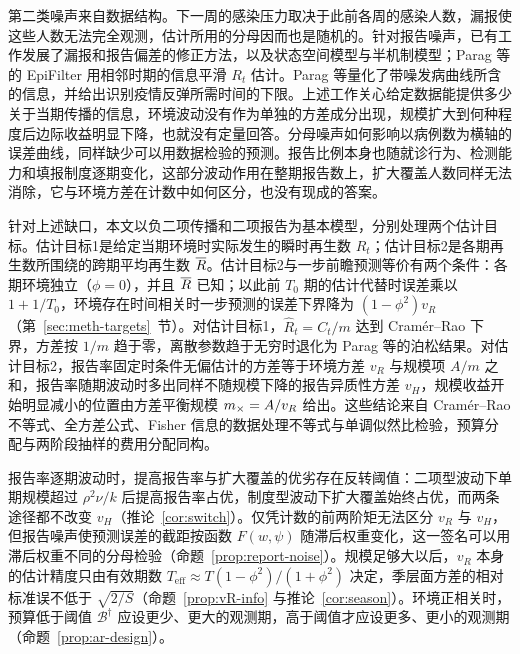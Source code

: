 第二类噪声来自数据结构。下一周的感染压力取决于此前各周的感染人数，漏报使这些人数无法完全观测，估计所用的分母因而也是随机的。针对报告噪声，已有工作发展了漏报和报告偏差的修正方法\citep{azmon2014estimating, stoner2019hierarchical, bracher2021marginal}，以及状态空间模型与半机制模型\citep{breto2009time, bhatt2023semi, flaxman2020estimating}；Parag 等\citep{parag2021improved}的 EpiFilter 用相邻时期的信息平滑 $R_t$ 估计。Parag 等\citep{parag2022quantifying, parag2022fundamental, parag2025asymmetric}量化了带噪发病曲线所含的信息，并给出识别疫情反弹所需时间的下限。上述工作关心给定数据能提供多少关于当期传播的信息，环境波动没有作为单独的方差成分出现，规模扩大到何种程度后边际收益明显下降，也就没有定量回答。分母噪声如何影响以病例数为横轴的误差曲线，同样缺少可以用数据检验的预测。报告比例本身也随就诊行为、检测能力和填报制度逐期变化，这部分波动作用在整期报告数上，扩大覆盖人数同样无法消除，它与环境方差在计数中如何区分，也没有现成的答案。

针对上述缺口，本文以负二项传播和二项报告为基本模型，分别处理两个估计目标。估计目标1是给定当期环境时实际发生的瞬时再生数 $R_t$；估计目标2是各期再生数所围绕的跨期平均再生数 $\overline{R}$。估计目标2与一步前瞻预测等价有两个条件：各期环境独立（$\phi=0$），并且 $\overline{R}$ 已知；以此前 $T_0$ 期的估计代替时误差乘以 $1+1/T_0$，环境存在时间相关时一步预测的误差下界降为 $(1-\phi^2)v_R$（第~\ref{sec:meth-targets}~节）。对估计目标1，$\widehat R_t=C_t/m$ 达到 Cramér--Rao 下界，方差按 $1/m$ 趋于零，离散参数趋于无穷时退化为 Parag 等的泊松结果。对估计目标2，报告率固定时条件无偏估计的方差等于环境方差 $v_R$ 与规模项 $A/m$ 之和，报告率随期波动时多出同样不随规模下降的报告异质性方差 $v_H$，规模收益开始明显减小的位置由方差平衡规模 $m_{\times}=A/v_R$ 给出。这些结论来自 Cramér--Rao 不等式、全方差公式、Fisher 信息的数据处理不等式与单调似然比检验\citep{casella2002statistical, lehmann2005testing, zamir1998proof}，预算分配与两阶段抽样的费用分配同构\citep{cochran1977sampling}。

报告率逐期波动时，提高报告率与扩大覆盖的优劣存在反转阈值：二项型波动下单期规模超过 $\rho^2\nu/k$ 后提高报告率占优，制度型波动下扩大覆盖始终占优，而两条途径都不改变 $v_H$（推论~\ref{cor:switch}）。仅凭计数的前两阶矩无法区分 $v_R$ 与 $v_H$，但报告噪声使预测误差的截距按函数 $F(w,\psi)$ 随滞后权重变化，这一签名可以用滞后权重不同的分母检验（命题~\ref{prop:report-noise}）。规模足够大以后，$v_R$ 本身的估计精度只由有效期数 $T_{\mathrm{eff}}\approx T(1-\phi^2)/(1+\phi^2)$ 决定，季层面方差的相对标准误不低于 $\sqrt{2/S}$（命题~\ref{prop:vR-info} 与推论~\ref{cor:season}）。环境正相关时，预算低于阈值 $\mathcal B^\dagger$ 应设更少、更大的观测期，高于阈值才应设更多、更小的观测期（命题~\ref{prop:ar-design}）。

